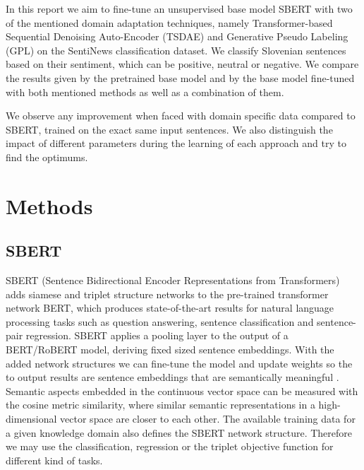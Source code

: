 \documentclass[fleqn,moreauthors,10pt]{ds_report}
\begin{document}
In this report we aim to fine-tune an unsupervised base model SBERT with two of the mentioned domain adaptation techniques, namely Transformer-based Sequential Denoising Auto-Encoder (TSDAE)  and Generative Pseudo Labeling (GPL) on the SentiNews classification dataset. We classify Slovenian sentences based on their sentiment, which can be positive, neutral or negative. We compare the results given by the pretrained base model and by the base model fine-tuned with both mentioned methods as well as a combination of them. 

We observe any improvement when faced with domain specific data compared to SBERT, trained on the exact same input sentences. We also distinguish the impact of different parameters during the learning of each approach and try to find the optimums.




\section*{Methods}

\subsection*{SBERT}
SBERT (Sentence Bidirectional Encoder Representations from Transformers) adds siamese and triplet structure networks to the pre-trained transformer network BERT, which produces state-of-the-art results for natural language processing tasks such as question answering, sentence classification and sentence-pair regression. SBERT applies a pooling layer to the output of a BERT/RoBERT model, deriving fixed sized sentence embeddings. With the added network structures we can fine-tune the model and update weights so the to output results are sentence embeddings that are semantically meaningful \cite{SBERT}. Semantic aspects embedded in the continuous vector space can be measured with the cosine metric similarity, where similar semantic representations in a high-dimensional vector space are closer to each other. The available training data for a given knowledge domain also defines the SBERT network structure. Therefore we may use the classification, regression or the triplet objective function for different kind of tasks.
\end{document}
